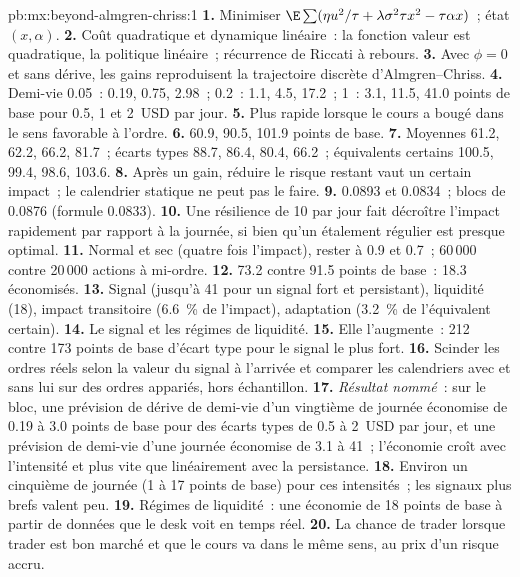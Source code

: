 \begin{solution}{pb:mx:beyond-almgren-chriss:1}
\textbf{1.} Minimiser $\E\sum(\eta u^2/\tau+\lambda\sigma^2\tau x^2-\tau\alpha x)$~; état $(x,\alpha)$.
\textbf{2.} Coût quadratique et dynamique linéaire~: la fonction valeur est quadratique, la politique linéaire~; récurrence de Riccati à rebours.
\textbf{3.} Avec $\phi=0$ et sans dérive, les gains reproduisent la trajectoire discrète d'Almgren--Chriss.
\textbf{4.} Demi-vie 0.05~: 0.19, 0.75, 2.98~; 0.2~: 1.1, 4.5, 17.2~; 1~: 3.1, 11.5, 41.0 points de base pour 0.5, 1 et 2~USD par jour.
\textbf{5.} Plus rapide lorsque le cours a bougé dans le sens favorable à l'ordre.
\textbf{6.} 60.9, 90.5, 101.9 points de base.
\textbf{7.} Moyennes 61.2, 62.2, 66.2, 81.7~; écarts types 88.7, 86.4, 80.4, 66.2~; équivalents certains 100.5, 99.4, 98.6, 103.6.
\textbf{8.} Après un gain, réduire le risque restant vaut un certain impact~; le calendrier statique ne peut pas le faire.
\textbf{9.} 0.0893 et 0.0834~; blocs de 0.0876 (formule 0.0833).
\textbf{10.} Une résilience de 10 par jour fait décroître l'impact rapidement par rapport à la journée, si bien qu'un étalement régulier est presque optimal.
\textbf{11.} Normal et sec (quatre fois l'impact), rester à 0.9 et 0.7~; 60\,000 contre 20\,000 actions à mi-ordre.
\textbf{12.} 73.2 contre 91.5 points de base~: 18.3 économisés.
\textbf{13.} Signal (jusqu'à 41 pour un signal fort et persistant), liquidité (18), impact transitoire (6.6~\% de l'impact), adaptation (3.2~\% de l'équivalent certain).
\textbf{14.} Le signal et les régimes de liquidité.
\textbf{15.} Elle l'augmente~: 212 contre 173 points de base d'écart type pour le signal le plus fort.
\textbf{16.} Scinder les ordres réels selon la valeur du signal à l'arrivée et comparer les calendriers avec et sans lui sur des ordres appariés, hors échantillon.
\textbf{17.} \emph{Résultat nommé}~: sur le bloc, une prévision de dérive de demi-vie d'un vingtième de journée économise de 0.19 à 3.0 points de base pour des écarts types de
0.5 à 2~USD par jour, et une prévision de demi-vie d'une journée économise de 3.1 à 41~; l'économie croît avec l'intensité et plus vite que linéairement avec la persistance.
\textbf{18.} Environ un cinquième de journée (1 à 17 points de base) pour ces intensités~; les signaux plus brefs valent peu.
\textbf{19.} Régimes de liquidité~: une économie de 18 points de base à partir de données que le desk voit en temps réel.
\textbf{20.} La chance de trader lorsque trader est bon marché et que le cours va dans le même sens, au prix d'un risque accru.
\end{solution}


